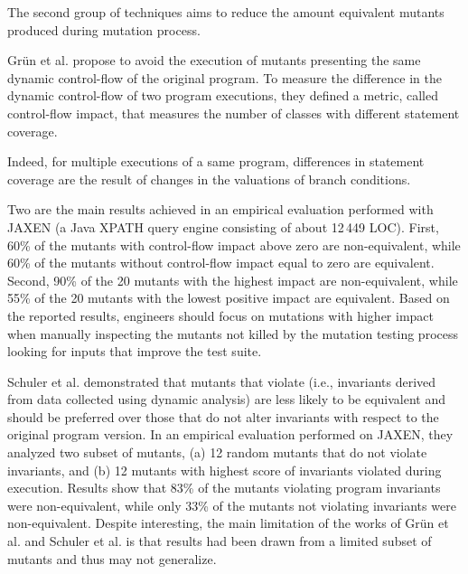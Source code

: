The second group of techniques aims to reduce the amount equivalent mutants produced during mutation process.

Gr\"{u}n et al. \cite{grun2009impact} propose to avoid the execution of mutants presenting the same dynamic control-flow of the original program.
To measure the difference in the dynamic control-flow of two program executions, they defined a metric, called control-flow impact, that measures
the number of classes with different statement coverage.

Indeed, for multiple executions of a same program, differences in statement coverage are the result of changes in the valuations of branch conditions.

Two are the main results achieved in an empirical evaluation performed with JAXEN (a Java XPATH query engine consisting of about 12\,449 LOC). 
First, 60\% of the mutants with control-flow impact above zero are non-equivalent, while 60\% of the mutants without control-flow impact equal to zero are equivalent. 
Second, 90\% of the 20 mutants with the highest impact are non-equivalent, while 55\% of the 20 mutants with the lowest positive impact are equivalent. 
Based on the reported results, engineers should focus on mutations with higher impact when manually inspecting the mutants not killed by the mutation testing process looking for inputs that improve the test suite.

Schuler et al. \cite{schuler2009efficient} demonstrated that mutants that violate  (i.e., invariants derived from data collected using dynamic analysis) are less likely to be equivalent and should be preferred over those that do not alter invariants with respect to the original program version. In an empirical evaluation performed on JAXEN, they analyzed two subset of mutants, 
(a) 12 random mutants that do not violate invariants, and (b) 12 mutants with highest score of invariants violated during execution. 
Results show that 83\% of the mutants violating program invariants were non-equivalent, while only 33\% of 
the mutants not violating invariants were non-equivalent.
Despite interesting, the main limitation of the works of Gr\"{u}n et al. \cite{grun2009impact} and Schuler et al. \cite{schuler2009efficient} is that results had been drawn from a limited subset of mutants and thus may not generalize.


